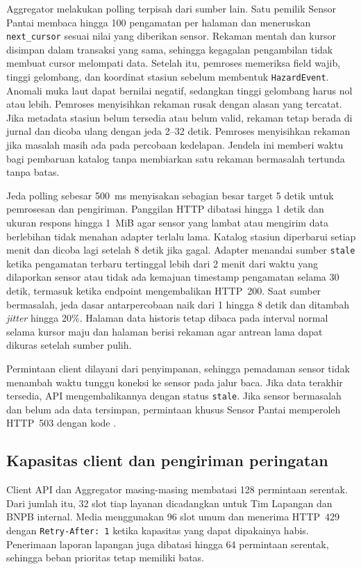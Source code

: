 Aggregator melakukan polling terpisah dari sumber lain. Satu pemilik Sensor Pantai membaca hingga 100 pengamatan per halaman dan meneruskan \texttt{next\_cursor} sesuai nilai yang diberikan sensor. Rekaman mentah dan kursor disimpan dalam transaksi yang sama, sehingga kegagalan pengambilan tidak membuat cursor melompati data. Setelah itu, pemroses memeriksa field wajib, tinggi gelombang, dan koordinat stasiun sebelum membentuk \texttt{HazardEvent}. Anomali muka laut dapat bernilai negatif, sedangkan tinggi gelombang harus nol atau lebih. Pemroses menyisihkan rekaman rusak dengan alasan yang tercatat. Jika metadata stasiun belum tersedia atau belum valid, rekaman tetap berada di jurnal dan dicoba ulang dengan jeda 2--32 detik. Pemroses menyisihkan rekaman jika masalah masih ada pada percobaan kedelapan. Jendela ini memberi waktu bagi pembaruan katalog tanpa membiarkan satu rekaman bermasalah tertunda tanpa batas.

Jeda polling sebesar 500~ms menyisakan sebagian besar target 5 detik untuk pemrosesan dan pengiriman. Panggilan HTTP dibatasi hingga 1 detik dan ukuran respons hingga 1~MiB agar sensor yang lambat atau mengirim data berlebihan tidak menahan adapter terlalu lama. Katalog stasiun diperbarui setiap menit dan dicoba lagi setelah 8 detik jika gagal. Adapter menandai sumber \texttt{stale} ketika pengamatan terbaru tertinggal lebih dari 2 menit dari waktu yang dilaporkan sensor atau tidak ada kemajuan timestamp pengamatan selama 30 detik, termasuk ketika endpoint mengembalikan HTTP~200. Saat sumber bermasalah, jeda dasar antarpercobaan naik dari 1 hingga 8 detik dan ditambah \textit{jitter} hingga 20\%. Halaman data historis tetap dibaca pada interval normal selama kursor maju dan halaman berisi rekaman agar antrean lama dapat dikuras setelah sumber pulih.

Permintaan client dilayani dari penyimpanan, sehingga pemadaman sensor tidak menambah waktu tunggu koneksi ke sensor pada jalur baca. Jika data terakhir tersedia, API mengembalikannya dengan status \texttt{stale}. Jika sensor bermasalah dan belum ada data tersimpan, permintaan khusus Sensor Pantai memperoleh HTTP~503 dengan kode .

\subsection{Kapasitas client dan pengiriman peringatan}

Client API dan Aggregator masing-masing membatasi 128 permintaan serentak. Dari jumlah itu, 32 slot tiap layanan dicadangkan untuk Tim Lapangan dan BNPB internal. Media menggunakan 96 slot umum dan menerima HTTP~429 dengan \texttt{Retry-After: 1} ketika kapasitas yang dapat dipakainya habis. Penerimaan laporan lapangan juga dibatasi hingga 64 permintaan serentak, sehingga beban prioritas tetap memiliki batas.

